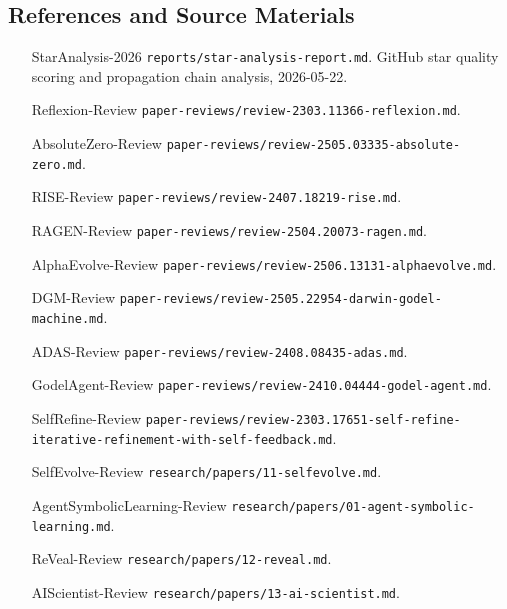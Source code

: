 \subsection{References and Source Materials}\label{sec:ch5-refs}

\begin{itemize}[nosep]
\item [StarAnalysis-2026] \texttt{reports/star-analysis-report.md}. GitHub star quality scoring and propagation chain analysis, 2026-05-22.
\item [Reflexion-Review] \texttt{paper-reviews/review-2303.11366-reflexion.md}.
\item [AbsoluteZero-Review] \texttt{paper-reviews/review-2505.03335-absolute-zero.md}.
\item [RISE-Review] \texttt{paper-reviews/review-2407.18219-rise.md}.
\item [RAGEN-Review] \texttt{paper-reviews/review-2504.20073-ragen.md}.
\item [AlphaEvolve-Review] \texttt{paper-reviews/review-2506.13131-alphaevolve.md}.
\item [DGM-Review] \texttt{paper-reviews/review-2505.22954-darwin-godel-machine.md}.
\item [ADAS-Review] \texttt{paper-reviews/review-2408.08435-adas.md}.
\item [GodelAgent-Review] \texttt{paper-reviews/review-2410.04444-godel-agent.md}.
\item [SelfRefine-Review] \texttt{paper-reviews/review-2303.17651-self-refine-iterative-refinement-with-self-feedback.md}.
\item [SelfEvolve-Review] \texttt{research/papers/11-selfevolve.md}.
\item [AgentSymbolicLearning-Review] \texttt{research/papers/01-agent-symbolic-learning.md}.
\item [ReVeal-Review] \texttt{research/papers/12-reveal.md}.
\item [AIScientist-Review] \texttt{research/papers/13-ai-scientist.md}.
\end{itemize}
